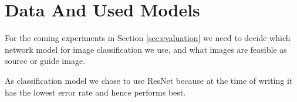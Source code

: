 \section{Data And Used Models}
\label{sec:data}
For the coming experiments in Section \ref{sec:evaluation} we need to decide which network model for image classification we use, and what images are feasible as source or guide image.

As classification model we chose to use ResNet because at the time of writing it has the lowest error rate and hence performs best\cite{cnnComparison}.